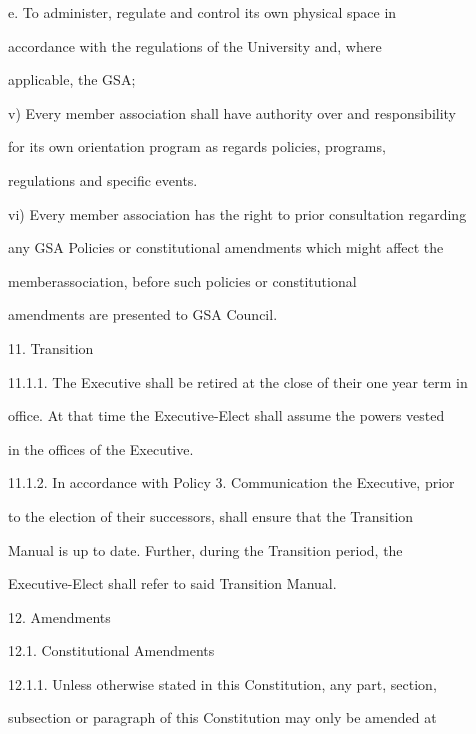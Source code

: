 \documentclass{article}
\begin{document}
e.  To  administer,  regulate  and  control  its  own  physical  space  in  

    accordance  with  the  regulations  of  the  University  and,  where  

    applicable, the GSA;  



v)      Every member association shall have authority over and responsibility  

for   its   own    orientation   program   as   regards   policies,   programs,  

regulations and specific events.  



vi)     Every member association has the right to prior consultation regarding  

any GSA Policies or constitutional amendments which might affect the  

memberassociation,      before     such     policies     or    constitutional  

amendments are presented to GSA Council.  



11.  Transition  



11.1.1.     The Executive shall be retired at the close of their one year term in  

office. At that time the Executive-Elect shall assume the powers vested  

in the offices of the Executive.  



11.1.2.     In accordance  with Policy  3. Communication the  Executive, prior  

to  the  election  of  their  successors,  shall  ensure  that  the  Transition  

Manual  is  up  to  date.  Further,  during  the  Transition  period,  the  

Executive-Elect shall refer to said Transition Manual.  



12.  Amendments  



12.1.       Constitutional Amendments  



12.1.1.     Unless  otherwise  stated  in  this  Constitution,  any  part,  section,  

subsection or paragraph of this Constitution may only be amended at  
\end{document}
